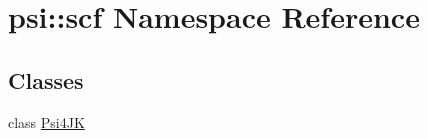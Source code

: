 \hypertarget{namespacepsi_1_1scf}{
\section{psi::scf Namespace Reference}
\label{namespacepsi_1_1scf}
}
\subsection*{Classes}
\begin{DoxyCompactItemize}
\item 
class \hyperlink{classpsi_1_1scf_1_1Psi4JK}{Psi4JK}
\end{DoxyCompactItemize}
